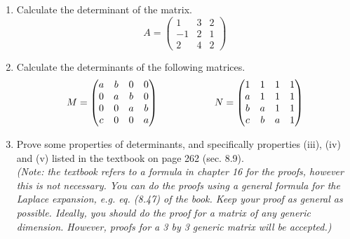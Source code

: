 \documentclass[fleqn]{article}
\begin{document}
  \begin{enumerate}
    \item  Calculate the determinant of the matrix. $$A = 
      \begin{pmatrix}
      1 & 3 & 2 \\
      -1 & 2 & 1 \\
      2 & 4 & 2
      \end{pmatrix} $$


    \item  Calculate the determinants of the following matrices. $$M = 
      \begin{pmatrix}
      a & b & 0 & 0 \\
      0 & a & b & 0 \\
      0 & 0 & a & b \\
      c & 0 & 0 & a
      \end{pmatrix} \hskip 2truecm
      N=\begin{pmatrix}
        1 & 1 & 1 & 1 \\
        a & 1 & 1 & 1 \\
        b &a & 1 & 1 \\
        c & b & a & 1
      \end{pmatrix}
      $$

    \item Prove some properties of determinants, and specifically properties (iii), (iv) and (v) listed in the textbook on page 262 (sec. 8.9). \\
    \emph{(Note: the textbook refers to a formula in chapter 16 for the proofs, however this is not necessary. You can do the proofs using a general formula for the Laplace expansion, e.g. eq. (8.47) of the book. Keep your proof as general as possible. Ideally, you should do the proof for a matrix of any generic dimension. However, proofs for a 3 by 3 generic matrix will be accepted.) }



\end{enumerate}
\end{document}
